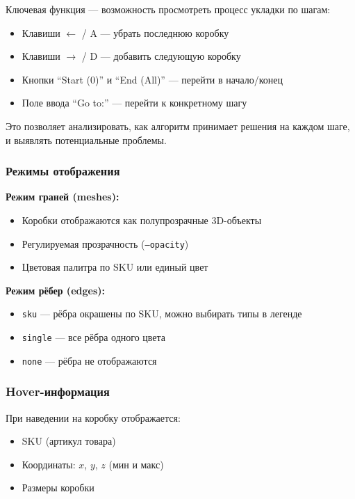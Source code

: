 Ключевая функция --- возможность просмотреть процесс укладки по шагам:
\begin{itemize}
    \item Клавиши $\leftarrow$ / A --- убрать последнюю коробку
    \item Клавиши $\rightarrow$ / D --- добавить следующую коробку
    \item Кнопки ``Start (0)'' и ``End (All)'' --- перейти в начало/конец
    \item Поле ввода ``Go to:'' --- перейти к конкретному шагу
\end{itemize}

Это позволяет анализировать, как алгоритм принимает решения на каждом шаге, и выявлять потенциальные проблемы.


\subsubsection{Режимы отображения}

\textbf{Режим граней (meshes):}
\begin{itemize}
    \item Коробки отображаются как полупрозрачные 3D-объекты
    \item Регулируемая прозрачность (\texttt{--opacity})
    \item Цветовая палитра по SKU или единый цвет
\end{itemize}

\textbf{Режим рёбер (edges):}
\begin{itemize}
    \item \texttt{sku} --- рёбра окрашены по SKU, можно выбирать типы в легенде
    \item \texttt{single} --- все рёбра одного цвета
    \item \texttt{none} --- рёбра не отображаются
\end{itemize}

\subsubsection{Hover-информация}

При наведении на коробку отображается:
\begin{itemize}
    \item SKU (артикул товара)
    \item Координаты: $x$, $y$, $z$ (мин и макс)
    \item Размеры коробки
\end{itemize}


